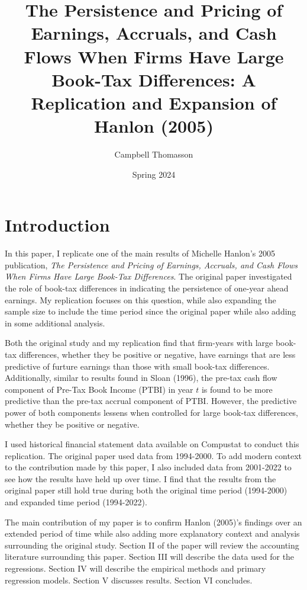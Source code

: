 \documentclass{article}
\title{The Persistence and Pricing of Earnings, Accruals, and Cash Flows When Firms Have Large Book-Tax Differences: A Replication and Expansion of Hanlon (2005)}
\author{Campbell Thomasson}
\date{Spring 2024}
\begin{document}
\maketitle

\section{Introduction}
In this paper, I replicate one of the main results of Michelle Hanlon’s 2005 publication, \textit{The Persistence and Pricing of Earnings, Accruals, and Cash Flows When Firms Have Large Book-Tax Differences}. The original paper investigated the role of book-tax differences in indicating the persistence of one-year ahead earnings. My replication focuses on this question, while also expanding the sample size to include the time period since the original paper while also adding in some additional analysis.

Both the original study and my replication find that firm-years with large book-tax differences, whether they be positive or negative, have earnings that are less predictive of furture earnings than those with small book-tax differences. Additionally, similar to results found in Sloan (1996), the pre-tax cash flow component of Pre-Tax Book Income (PTBI) in year $t$ is found to be more predictive than the pre-tax accrual component of PTBI. However, the predictive power of both components lessens when controlled for large book-tax differences, whether they be positive or negative.

I used historical financial statement data available on Compustat to conduct this replication. The original paper used data from 1994-2000. To add modern context to the contribution made by this paper, I also included data from 2001-2022 to see how the results have held up over time. I find that the results from the original paper still hold true during both the original time period (1994-2000) and expanded time period (1994-2022).

The main contribution of my paper is to confirm Hanlon (2005)’s findings over an extended period of time while also adding more explanatory context and analysis surrounding the original study. Section II of the paper will review the accounting literature surrounding this paper. Section III will describe the data used for the regressions. Section IV will describe the empirical methods and primary regression models. Section V discusses results. Section VI concludes.
\end{document}
